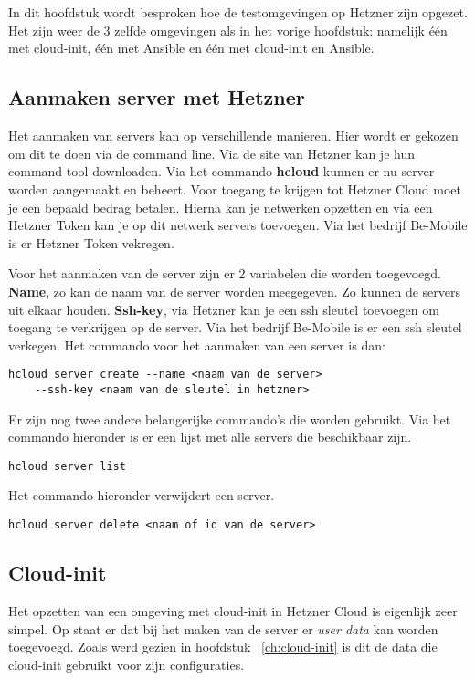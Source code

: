 \chapter{}
\label{ch:testhetzner}
In dit hoofdstuk wordt besproken hoe de testomgevingen op Hetzner zijn opgezet. Het zijn weer de 3 zelfde omgevingen als in het vorige hoofdstuk: namelijk één met cloud-init, één met Ansible en één met cloud-init en Ansible.

\section{Aanmaken server met Hetzner}
Het aanmaken van servers kan op verschillende manieren. Hier wordt er gekozen om dit te doen via de command line. Via de site van Hetzner kan je hun command tool downloaden. Via het commando \textbf{hcloud} kunnen er nu server worden aangemaakt en beheert. Voor toegang te krijgen tot Hetzner Cloud moet je een bepaald bedrag betalen. Hierna kan je netwerken opzetten en via een Hetzner Token kan je op dit netwerk servers toevoegen. Via het bedrijf Be-Mobile is er Hetzner Token vekregen.

Voor het aanmaken van de server zijn er 2 variabelen die worden toegevoegd. \textbf{Name}, zo kan de naam van de server worden meegegeven. Zo kunnen de servers uit elkaar houden. \textbf{Ssh-key}, via Hetzner kan je een ssh sleutel toevoegen om toegang te verkrijgen op de server. Via het bedrijf Be-Mobile is er een ssh sleutel verkegen. Het commando  voor het aanmaken van een server is dan:
\begin{lstlisting}
hcloud server create --name <naam van de server> 
    --ssh-key <naam van de sleutel in hetzner>
\end{lstlisting}

Er zijn nog twee andere belangerijke commando's die worden gebruikt. Via het commando hieronder is er een lijst met alle servers die beschikbaar zijn.
\begin{lstlisting}
hcloud server list
\end{lstlisting}
Het commando hieronder verwijdert een server.
\begin{lstlisting}
hcloud server delete <naam of id van de server>
\end{lstlisting}


\section{Cloud-init}
Het opzetten van een omgeving met cloud-init in Hetzner Cloud is eigenlijk zeer simpel. Op \autocite{hetznerWiki} staat er dat bij het maken van de server er \textit{user data} kan worden toegevoegd. Zoals werd gezien in hoofdstuk ~\ref{ch:cloud-init} is dit de data die cloud-init gebruikt voor zijn configuraties.

